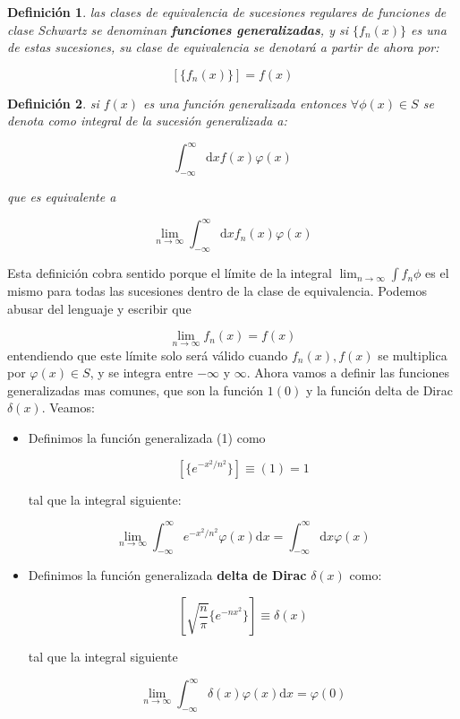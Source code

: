 \documentclass[12pt]{book}
\newcommand{\D}{\mathrm{d}}
\newcommand{\inti}{\int_{-\infty}^{\infty}}
\newtheorem{definicion}{Definición}[section]
\begin{document}
\begin{definicion}
las clases de equivalencia de sucesiones regulares de funciones de clase Schwartz se denominan \textbf{funciones generalizadas}, y si $\{ f_n (x) \}$ es una de estas sucesiones, su clase de equivalencia se denotará a partir de ahora por:

$$ \left[ \{ f_n (x) \} \right] = f(x) $$
\end{definicion}

\begin{definicion}
si $f(x)$ es una función generalizada entonces $\forall \phi (x) \in S$ se denota como integral de la sucesión generalizada a:

$$ \inti \D x f(x) \varphi(x)  $$

que es equivalente a 

$$ \lim_{n \rightarrow \infty} \inti \D x f_n(x) \varphi (x) $$
\end{definicion}

Esta definición cobra sentido porque el límite de la integral $\lim_{n \rightarrow \infty} \int f_n \phi$ es el mismo para todas las sucesiones dentro de la clase de equivalencia. Podemos abusar del lenguaje y escribir que

\begin{equation}
\lim_{n \rightarrow \infty} f_n (x) = f(x)
\end{equation}
entendiendo que este límite solo será válido cuando $f_n (x),f(x)$ se multiplica por $\varphi (x) \in S$, y se integra entre $- \infty$ y $\infty$. Ahora vamos a definir las funciones generalizadas mas comunes, que son la función $1(0)$ y la función delta de Dirac $\delta(x)$. Veamos:

\begin{itemize}
\item Definimos la función generalizada (1) como 

$$ [ \{ e^{-x^2/n^2} \} ] \equiv (1) =  1 $$

tal que la integral siguiente:
 
$$ \lim_{n \rightarrow \infty} \inti e^{-x^2 / n^2} \varphi (x) \D x = \inti \D x \varphi (x) $$ 

\item Definimos la función generalizada \textbf{delta de Dirac} $\delta (x)$ como:

$$ [  \sqrt{\dfrac{n}{\pi}} \{ e^{-nx^2} \} ] \equiv \delta (x) $$

tal que la integral siguiente

$$ \lim_{n \rightarrow \infty} \inti \delta(x) \varphi (x) \D x = \varphi (0) $$ 
\end{itemize}
\end{document}
